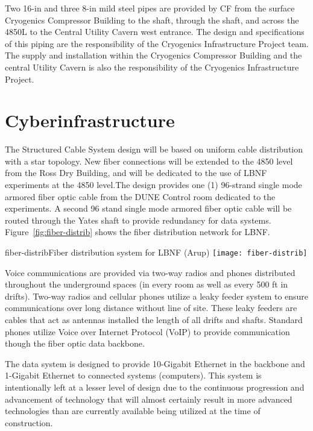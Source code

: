 Two 16-in and three 8-in mild steel pipes are provided by CF from the surface Cryogenics Compressor Building to the shaft, through the shaft, and across the 4850L to the Central Utility Cavern west entrance. The design and specifications of this piping are the responsibility of the Cryogenics Infrastructure Project team. The supply and installation within the Cryogenics Compressor Building and the central Utility Cavern is also the responsibility of the Cryogenics Infrastructure Project.


\section{Cyberinfrastructure}
\label{sec:fscf-und-cyber}

The Structured Cable System design will be based on uniform cable distribution with a star topology. New fiber connections will be extended to the 4850 level from the Ross Dry Building, and will be dedicated to the use of LBNF experiments at the 4850 level.The design provides one (1) 96-strand single mode armored fiber optic cable from the DUNE Control room dedicated to the experiments. A second 96 stand single mode armored fiber optic cable will be routed through the Yates shaft to provide redundancy for data systems.  Figure~\ref{fig:fiber-distrib} shows the fiber distribution network for LBNF.

\begin{cdrfigure}{fiber-distrib}{Fiber distribution system for LBNF (Arup)}
\texttt{[image: fiber-distrib]}
\end{cdrfigure}

Voice communications are provided via two-way radios and phones distributed throughout the underground spaces (in every room as well as every 500 ft in drifts). Two-way radios and cellular phones utilize a leaky feeder system to ensure communications over long distance without line of site. These leaky feeders are cables that act as antennas installed the length of all drifts and shafts. Standard phones utilize Voice over Internet Protocol (VoIP) to provide communication though the fiber optic data backbone.

The data system is designed to provide 10-Gigabit Ethernet in the backbone and 1-Gigabit Ethernet to connected systems (computers). This system is intentionally left at a lesser level of design due to the continuous progression and advancement of technology that will almost certainly result in more advanced technologies than are currently available being utilized at the time of construction.

